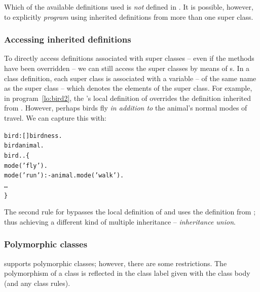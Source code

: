 Which of the available definitions used is \emph{not} defined in \go. It is possible, however, to explicitly \emph{program} using inherited definitions from more than one super class.

\subsubsection{Accessing inherited definitions}
\label{objects:super}

To directly access definitions associated with super classes -- even if the methods have been overridden -- we can still access the super classes by means of s. In a class definition, each super class is associated with a variable -- of the same name as the super class -- which denotes the elements of the super class.
For example, in program~\vref{lo:bird2}, the 's local definition of  overrides the definition inherited from . However, perhaps birds fly \emph{in addition to} the animal's normal modes of travel. We can capture this with:
\begin{alltt}
bird:[] \conarrow birdness.
bird\classarrow{}animal.
bird..\{
  mode('fly').
  mode('run') :- animal.mode('walk').
  \ldots
\}
\end{alltt}
The second rule for  bypasses the local definition of  and uses the definition from ; thus achieving a different kind of multiple inheritance -- \emph{inheritance union}.

\subsubsection{Polymorphic classes}
\go supports polymorphic classes; however, there are some restrictions. The polymorphism of a class is reflected in the class label given with the class body (and any class rules).

